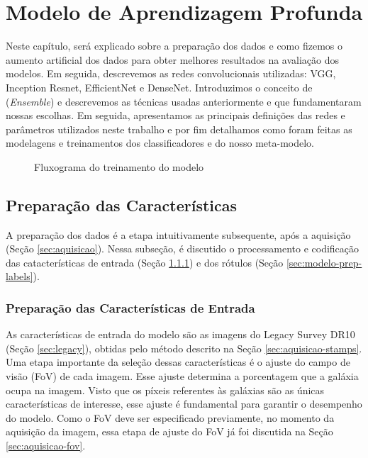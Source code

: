 \section{Modelo de Aprendizagem Profunda}
\label{sec:modelo}

Neste capítulo, será explicado sobre a preparação dos dados e como fizemos o aumento artificial dos dados para obter melhores resultados na avaliação dos modelos. Em seguida, descrevemos as redes convolucionais utilizadas: VGG, Inception Resnet, EfficientNet e DenseNet. Introduzimos o conceito de (\emph{Ensemble}) e descrevemos as técnicas usadas anteriormente e que fundamentaram nossas escolhas. Em seguida, apresentamos as principais definições das redes e parâmetros utilizados neste trabalho e por fim detalhamos como foram feitas as modelagens e treinamentos dos classificadores e do nosso meta-modelo.


\begin{figure}[!ht]
  \centering
  \caption{Fluxograma do treinamento do modelo}
  \label{fig:flow-modelo}
\end{figure}


\subsection{Preparação das Características}
\label{sec:modelo-prep}
A preparação dos dados é a etapa intuitivamente subsequente, após a aquisição (Seção \ref{sec:aquisicao}). Nessa subseção, é discutido o processamento e codificação das catacterísticas de entrada (Seção \ref{sec:modelo-prep-input}) e dos rótulos (Seção \ref{sec:modelo-prep-labels}).


\subsubsection{Preparação das Características de Entrada}
\label{sec:modelo-prep-input}
As características de entrada do modelo são as imagens do Legacy Survey DR10 (Seção \ref{sec:legacy}), obtidas pelo método descrito na Seção \ref{sec:aquisicao-stamps}. Uma etapa importante da seleção dessas características é o ajuste do campo de visão (FoV) de cada imagem. Esse ajuste determina a porcentagem que a galáxia ocupa na imagem. Visto que os píxeis referentes às galáxias são as únicas características de interesse, esse ajuste é fundamental para garantir o desempenho do modelo. Como o FoV deve ser especificado previamente, no momento da aquisição da imagem, essa etapa de ajuste do FoV já foi discutida na Seção \ref{sec:aquisicao-fov}.


